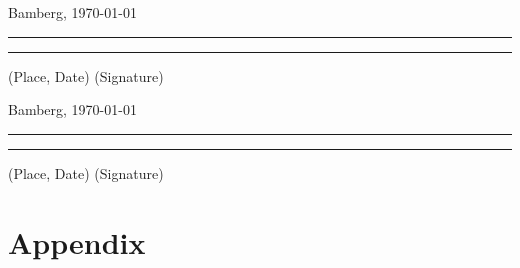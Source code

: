 \documentclass[a4paper]{article}
\begin{document}
Bamberg, \today

\rule[0.5em]{14em}{0.5pt} \hspace{0.25\linewidth}\rule[0.5em]{14em}{0.5pt}
\vspace{1em}
\hspace{4em} (Place, Date) \hspace{0.51\linewidth} (Signature)

Bamberg, \today

\rule[0.5em]{14em}{0.5pt} \hspace{0.25\linewidth}\rule[0.5em]{14em}{0.5pt}
\vspace{1em}
\hspace{4em} (Place, Date) \hspace{0.51\linewidth} (Signature)






\newpage
\appendix


\section{Appendix}
\end{document}
